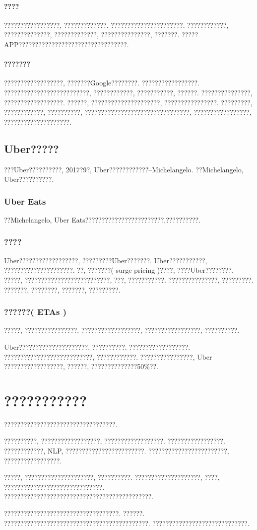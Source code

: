 \documentclass[lang=cn,11pt,a4paper]{elegantpaper}
\begin{document}
\paragraph{????}?????????????????, ?????????????. ??????????????????????. ????????????, ??????????????, ?????????????, ???????????????, ???????. ?????APP?????????????????????????????????.
\paragraph{???????}??????????????????, ???????Google????????. ?????????????????. ??????????????????????????, ????????????, ???????????, ??????. ???????????????, ??????????????????. ??????, ?????????????????????, ????????????????. ?????????, ????????????, ??????????, ????????????????????????????????, ?????????????????, ????????????????????. 
\subsection{Uber?????}
???Uber??????????, 2017?9?, Uber????????????--Michelangelo. ??Michelangelo, Uber??????????. 
\subsubsection*{Uber Eats} 
??Michelangelo, Uber Eats????????????????????????,??????????. 
\subsubsection*{????}
Uber??????????????????, ?????????Uber???????. Uber???????????, ?????????????????????. ??, ???????( surge  pricing )????, ????Uber????????. ?????, ??????????????????????????, ???, ???????????. ???????????????, ?????????. ???????, ????????, ???????, ?????????. 
\subsubsection*{??????( ETAs )}
?????, ????????????????. ??????????????????, ?????????????????, ??????????. 

Uber?????????????????????, ??????????. ??????????????????. ???????????????????????????, ????????????. ????????????????, Uber ??????????????????, ??????, ??????????????50\%??. 

\section{???????????}
\par ??????????????????????????????????. 
\par ??????????, ??????????????????, ??????????????????. ?????????????????. ????????????, NLP, ????????????????????????. ????????????????????????, ?????????????????. 
\par ?????, ?????????????????????, ??????????. ????????????????????, ????, ??????????????????????????????. ?????????????????????????????????????????????.
\par ???????????????????????????????????. ??????. ????????????????????????????????????????????. ?????????????????????????????.
\end{document}
